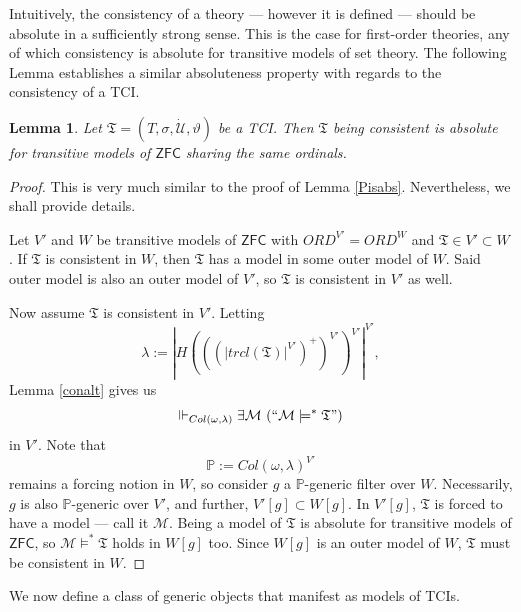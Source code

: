 \documentclass[12pt, twoside]{memoir}
\numberwithin{equation}{section}
\newtheorem{lem}[thm]{Lemma}
\theoremstyle{definition}
\theoremstyle{remark}
\theoremstyle{definition}
\theoremstyle{definition}
\theoremstyle{definition}
\theoremstyle{remark}
\begin{document}
Intuitively, the consistency of a theory --- however it is defined --- should be absolute in a sufficiently strong sense. This is the case for first-order theories, any of which consistency is absolute for transitive models of set theory. The following Lemma establishes a similar absoluteness property with regards to the consistency of a TCI.

\begin{lem}
Let $\mathfrak{T} = (T, \sigma, \dot{\mathcal{U}}, \vartheta)$ be a TCI. Then $\mathfrak{T}$ being consistent is absolute for transitive models of $\mathsf{ZFC}$ sharing the same ordinals.
\end{lem}

\begin{proof}
This is very much similar to the proof of Lemma \ref{Pisabs}. Nevertheless, we shall provide details. 

Let $V'$ and $W$ be transitive models of $\mathsf{ZFC}$ with $ORD^{V'} = ORD^W$ and $\mathfrak{T} \in V' \subset W$. If $\mathfrak{T}$ is consistent in $W$, then $\mathfrak{T}$ has a model in some outer model of $W$. Said outer model is also an outer model of $V'$, so $\mathfrak{T}$ is consistent in $V'$ as well.

Now assume $\mathfrak{T}$ is consistent in $V'$. Letting $$\lambda := |H(((|trcl(\mathfrak{T})|^{V'})^+)^{V'})^{V'}|^{V'},$$ Lemma \ref{conalt} gives us $$\Vdash_{Col(\omega, \lambda)} \exists \mathcal{M} \ (``\mathcal{M} \models^* \mathfrak{T}")$$ in $V'$. Note that $$\mathbb{P} := Col(\omega, \lambda)^{V'}$$ remains a forcing notion in $W$, so consider $g$ a $\mathbb{P}$-generic filter over $W$. Necessarily, $g$ is also $\mathbb{P}$-generic over $V'$, and further, $V'[g] \subset W[g]$. In $V'[g]$, $\mathfrak{T}$ is forced to have a model --- call it $\mathcal{M}$. Being a model of $\mathfrak{T}$ is absolute for transitive models of $\mathsf{ZFC}$, so $\mathcal{M} \models^* \mathfrak{T}$ holds in $W[g]$ too. Since $W[g]$ is an outer model of $W$, $\mathfrak{T}$ must be consistent in $W$.
\end{proof}

We now define a class of generic objects that manifest as models of TCIs.
\end{document}
